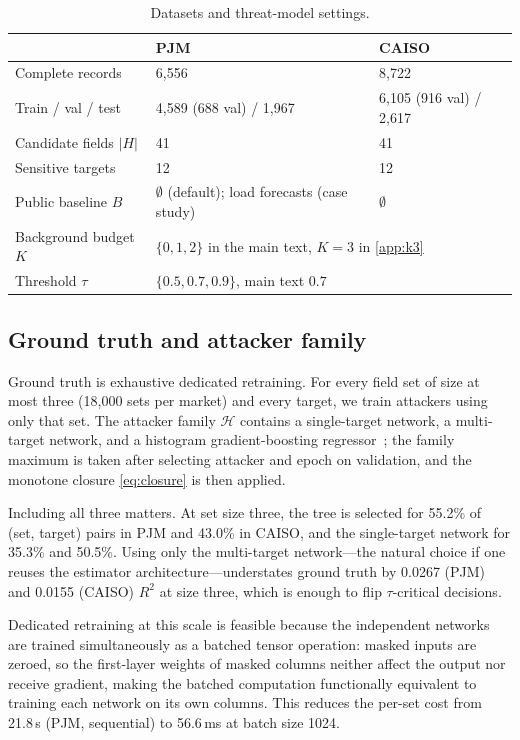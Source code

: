 \documentclass[preprint,12pt]{elsarticle}
\newcommand{\Rtwo}{R^{2}}
\begin{document}
\begin{table}[t]
\centering
\caption{Datasets and threat-model settings.}
\label{tab:data}
\small
\begin{tabular}{lll}
\toprule
& PJM & CAISO \\
\midrule
Complete records & 6{,}556 & 8{,}722 \\
Train / val / test & 4{,}589 (688 val) / 1{,}967 & 6{,}105 (916 val) / 2{,}617 \\
Candidate fields $|H|$ & 41 & 41 \\
Sensitive targets & 12 & 12 \\
Public baseline $B$ & $\emptyset$ (default); load forecasts (case study) & $\emptyset$ \\
Background budget $K$ & \multicolumn{2}{l}{$\{0,1,2\}$ in the main text, $K=3$ in \ref{app:k3}} \\
Threshold $\tau$ & \multicolumn{2}{l}{$\{0.5,0.7,0.9\}$, main text $0.7$} \\
\bottomrule
\end{tabular}
\end{table}

\subsection{Ground truth and attacker family}
Ground truth is exhaustive dedicated retraining. For every field set of size at most three
(18{,}000 sets per market) and every target, we train attackers using only that set. The
attacker family $\mathcal{H}$ contains a single-target network, a multi-target network, and
a histogram gradient-boosting regressor~\cite{ke2017lightgbm}; the family maximum is taken
after selecting attacker and epoch on validation, and the monotone closure
\eqref{eq:closure} is then applied.

Including all three matters. At set size three, the tree is selected for 55.2\% of
(set, target) pairs in PJM and 43.0\% in CAISO, and the single-target network for 35.3\% and
50.5\%. Using only the multi-target network---the natural choice if one reuses the estimator
architecture---understates ground truth by 0.0267 (PJM) and 0.0155 (CAISO) $\Rtwo$ at size
three, which is enough to flip $\tau$-critical decisions.

Dedicated retraining at this scale is feasible because the independent networks are trained
simultaneously as a batched tensor operation: masked inputs are zeroed, so the first-layer
weights of masked columns neither affect the output nor receive gradient, making the batched
computation functionally equivalent to training each network on its own columns. This reduces
the per-set cost from 21.8\,s (PJM, sequential) to 56.6\,ms at batch size 1024.
\end{document}
